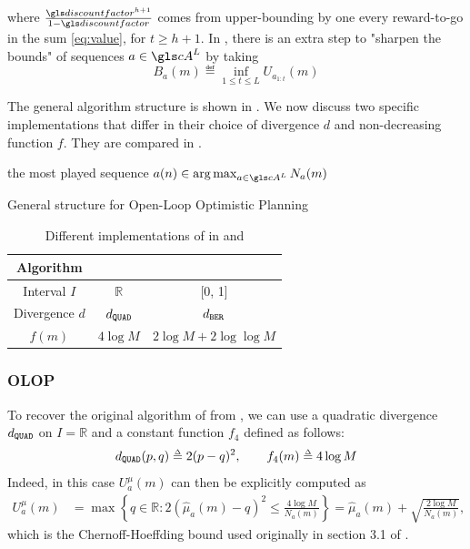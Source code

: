 \noindent
where $\frac{\discount^{h+1}}{1-\discount}$ comes from upper-bounding by one every reward-to-go in the sum \eqref{eq:value}, for $t\geq h+1$. In \citep{Bubeck2010}, there is an extra step to "sharpen the bounds" of sequences $a \in \cA^L$ by taking
\begin{equation}
\label{eq:Ba}
B_a(m) \eqdef \inf_{1 \leq t \leq L} U_{a_{1:t}}(m)
\end{equation}


The general algorithm structure is shown in .
We now discuss two specific implementations that differ in their choice of divergence $d$ and non-decreasing function $f$. They are compared in .

\begin{algorithm}[tp]
	\DontPrintSemicolon
	\Return the most played sequence $a(n) \in \argmax_{a\in \cA^L} N_a(m)$
	\caption{General structure for Open-Loop Optimistic Planning}
	\label{algo:kl-olop}
\end{algorithm}

\begin{table}[tp]
	\caption{Different implementations of  in \OLOP and \KLOLOP}
	\label{tab:comparison}
	\centering
	\begin{tabular}{ccc}
		\toprule
		Algorithm & \OLOP & \KLOLOP \\
		\midrule
		Interval $I$ & $\mathbb{R}$ & [0, 1] \\
		Divergence $d$ & $d_\texttt{QUAD}$ & $d_\texttt{BER}$ \\
		$f(m)$ & $4 \log M$ & $2\log M + 2 \log\log M$\\
		\bottomrule
	\end{tabular}
\end{table}

\subsubsection{\gls*{OLOP}}
\label{sec:kl-olop-olop}
To recover the original \OLOP algorithm of \citet{Bubeck2010} from , we can use a quadratic divergence $d_\texttt{QUAD}$ on $I=\mathbb{R}$ and a constant function $f_4$ defined as follows:
\begin{equation*}
\dquad(p,q) \eqdef 2(p-q)^2,\qquad
f_4(m) \eqdef 4 \log M
\end{equation*}
Indeed, in this case $U^{\mu}_a(m)$ can then be explicitly computed as
\begin{align*}
U^{\mu}_a(m) &= \max \left\{q\in \mathbb{R}: 2(\hat{\mu}_a(m) - q)^2 \leq \frac{4 \log M }{N_a(m)} \right\} = \hat{\mu}_a(m) + \sqrt{\frac{2 \log M}{N_a(m)}},
\end{align*}
which is the Chernoff-Hoeffding bound used originally in section 3.1 of \citep{Bubeck2010}.


